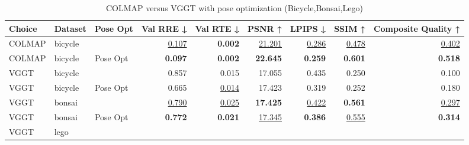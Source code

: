 \begin{table}[H]
\caption{COLMAP versus VGGT with pose optimization (Bicycle,Bonsai,Lego)}
\label{tab:04_pose_opt_bicycle,bonsai,lego}
\small
\begin{tabular}{lllrrrrrr}
\toprule
Choice & Dataset & Pose Opt & Val RRE ↓ & Val RTE ↓ & PSNR ↑ & LPIPS ↓ & SSIM ↑ & Composite Quality ↑ \\
\midrule
COLMAP & bicycle &  & \underline{0.107} & \textbf{0.002} & \underline{21.201} & \underline{0.286} & \underline{0.478} & \underline{0.402} \\
COLMAP & bicycle & Pose Opt & \textbf{0.097} & \textbf{0.002} & \textbf{22.645} & \textbf{0.259} & \textbf{0.601} & \textbf{0.518} \\
VGGT & bicycle &  & 0.857 & 0.015 & 17.055 & 0.435 & 0.250 & 0.100 \\
VGGT & bicycle & Pose Opt & 0.665 & \underline{0.014} & 17.423 & 0.319 & 0.252 & 0.180 \\
\midrule
VGGT & bonsai &  & \underline{0.790} & \underline{0.025} & \textbf{17.425} & \underline{0.422} & \textbf{0.561} & \underline{0.297} \\
VGGT & bonsai & Pose Opt & \textbf{0.772} & \textbf{0.021} & \underline{17.345} & \textbf{0.386} & \underline{0.555} & \textbf{0.314} \\
\midrule
VGGT & lego &  &  &  &  &  &  &  \\
\bottomrule
\end{tabular}
\end{table}